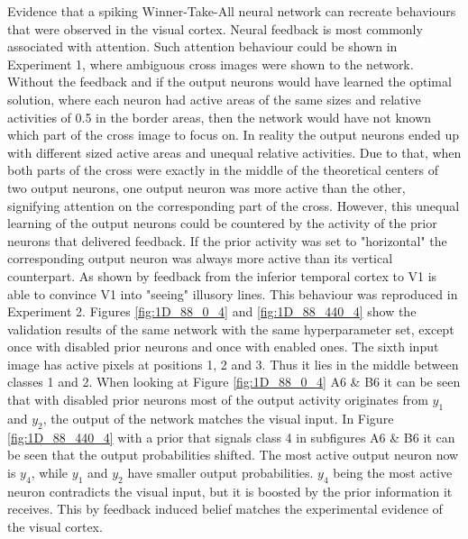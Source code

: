 Evidence that a spiking Winner-Take-All neural network can recreate behaviours that were observed in the visual cortex. Neural feedback is most commonly associated with attention. Such attention behaviour could be shown in Experiment 1, where ambiguous cross images were shown to the network. Without the feedback and if the output neurons would have learned the optimal solution, where each neuron had active areas of the same sizes and relative activities of 0.5 in the border areas, then the network would have not known which part of the cross image to focus on. In reality the output neurons ended up with different sized active areas and unequal relative activities. Due to that, when both parts of the cross were exactly in the middle of the theoretical centers of two output neurons, one output neuron was more active than the other, signifying attention on the corresponding part of the cross. However, this unequal learning of the output neurons could be countered by the activity of the prior neurons that delivered feedback. If the prior activity was set to "horizontal" the corresponding output neuron was always more active than its vertical counterpart. As shown by \citet{HierachicalBayesVisualCortex} feedback from the inferior temporal cortex to V1 is able to convince V1 into "seeing" illusory lines. This behaviour was reproduced in Experiment 2. Figures \ref{fig:1D_88_0_4} and \ref{fig:1D_88_440_4} show the validation results of the same network with the same hyperparameter set, except once with disabled prior neurons and once with enabled ones. The sixth input image has active pixels at positions 1, 2 and 3. Thus it lies in the middle between classes 1 and 2. When looking at Figure \ref{fig:1D_88_0_4} A6 & B6 it can be seen that with disabled prior neurons most of the output activity originates from $y_1$ and $y_2$, the output of the network  matches the visual input. In Figure \ref{fig:1D_88_440_4} with a prior that signals class 4 in subfigures A6 & B6 it can be seen that the output probabilities shifted. The most active output neuron now is $y_4$, while $y_1$ and $y_2$ have smaller output probabilities. $y_4$ being the most active neuron contradicts the visual input, but it is boosted by the prior information it receives. This by feedback induced belief matches the experimental evidence of the visual cortex.

